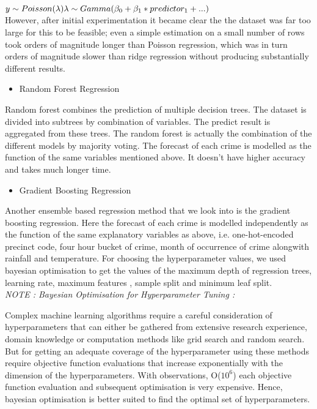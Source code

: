 \documentclass[10pt,journal,compsoc]{IEEEtran}
\begin{document}
$y  \sim  Poisson(\lambda) \\
\lambda \sim Gamma (\beta_{0} + \beta_{1} * predictor_{1} + ...)\\
$\\
However, after initial experimentation it became clear the the dataset was far too large
for this to be feasible; even a simple estimation on a small number of rows took orders
of magnitude longer than Poisson regression, which was in turn orders of magnitude
slower than ridge regression without producing substantially different results.\\

\begin{itemize}
  \item Random Forest Regression
\end{itemize}

Random forest combines the prediction of multiple decision trees. The dataset is divided
into subtrees by combination of variables. The predict result is aggregated from these
trees. The random forest is actually the combination of the different models by majority
voting. The forecast of each crime is modelled as the function of the same variables
mentioned above. It doesn’t have higher accuracy and takes much longer time.\\

\begin{itemize}
  \item Gradient Boosting Regression
\end{itemize}

Another ensemble based regression method that we look into is the gradient boosting
regression. Here the forecast of each crime is modelled independently as the function of
the same explanatory variables as above, i.e. one-hot-encoded precinct code, four hour
bucket of crime, month of occurrence of crime alongwith rainfall and temperature. For
choosing the hyperparameter values, we used bayesian optimisation to get the values
of the maximum depth of regression trees, learning rate, maximum features , sample
split and minimum leaf split.\\

\textit{NOTE : Bayesian Optimisation for Hyperparameter Tuning :}

Complex machine learning algorithms require a careful consideration of
hyperparameters that can either be gathered from extensive research experience,
domain knowledge or computation methods like grid search and random search. But for
getting an adequate coverage of the hyperparameter using these methods require
objective function evaluations that increase exponentially with the dimension of the
hyperparameters. With observations, O($10^6$) each objective function evaluation and
subsequent optimisation is very expensive. Hence, bayesian optimisation is better
suited to find the optimal set of hyperparameters.\\
\end{document}
